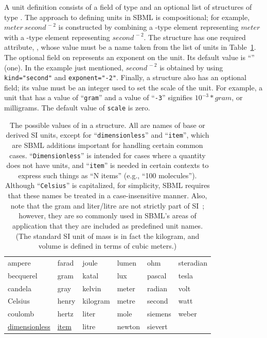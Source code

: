 \documentclass[10pt]{cekarticle}
\newcommand{\changed}[1]{\textcolor{BrickRed}{#1}}
\newenvironment{blockChanged}{\color{BrickRed}}{}
\begin{document}
\begin{blockChanged}
A unit definition consists of a  field of type 
and an optional list of structures of type .  The approach to
defining units in SBML is compositional; for example, $meter\ 
second^{\,-2}$ is constructed by combining a -type element
representing $meter$ with a -type element representing
$second^{\,-2}$.  The \class{Unit} structure has one required attribute,
\attrib{kind}, whose value must be a name taken from the list of units in
Table~\ref{tab:unitkind}.  The optional \attrib{exponent} field on
\class{Unit} represents an exponent on the unit.  Its default value is
``\attribvalue{1}'' (one).  In the example just mentioned, $second^{\,-2}$
is obtained by using \texttt{kind="second"} and \texttt{exponent="-2"}.
Finally, a \class{Unit} structure also has an optional \attrib{scale}
field; its value must be an integer used to set the scale of the unit.  For
example, a unit that has a \attrib{kind} value of ``\texttt{gram}'' and a
\attrib{scale} value of ``\texttt{-3}'' signifies $10^{-3} * gram$, or
milligrams.  The default value of \texttt{scale} is zero.
\end{blockChanged}


\begin{table}[thb]
  \centering
  \ttfamily
  \begin{tabular}{llllll}
    \toprule
    ampere      	& farad	& joule		& lumen		& ohm     & steradian\\
    becquerel   	& gram	& katal		& lux		& pascal  & tesla\\
    candela		& gray	& kelvin	& meter		& radian  & volt\\
    \changed{Celsius}	& henry	& kilogram	& metre		& second  & watt\\
    coulomb		& hertz	& liter		& mole		& siemens & weber\\
    \underline{dimensionless} & \underline{item} & litre	& newton	& sievert\\
    \bottomrule
  \end{tabular}
  \caption{The possible values of  in a 
    structure.  All are names of base or derived SI units, except for
    ``\texttt{dimensionless}'' and ``\texttt{item}'', which are 
    SBML additions important for handling certain common cases.
    ``\texttt{Dimensionless}'' is intended for cases where a quantity does not
    have units, and ``\texttt{item}'' is  needed in certain contexts to express
    such things as ``N items'' (e.g., ``100 molecules'').
    \changed{Although ``\texttt{Celsius}'' is capitalized, for 
    simplicity, SBML
    requires that these names be treated in a case-insensitive manner.
    Also, note that the gram and liter/litre are not
    strictly part of SI~\protect\citep{bipm:2000}; however, they are so
    commonly used in SBML's areas of application that they 
    are included as predefined unit names.}  (The standard SI unit of
    mass is in fact the kilogram, and volume is
    defined in terms of cubic meters.)}
  \label{tab:unitkind}
\end{table}
\end{document}
